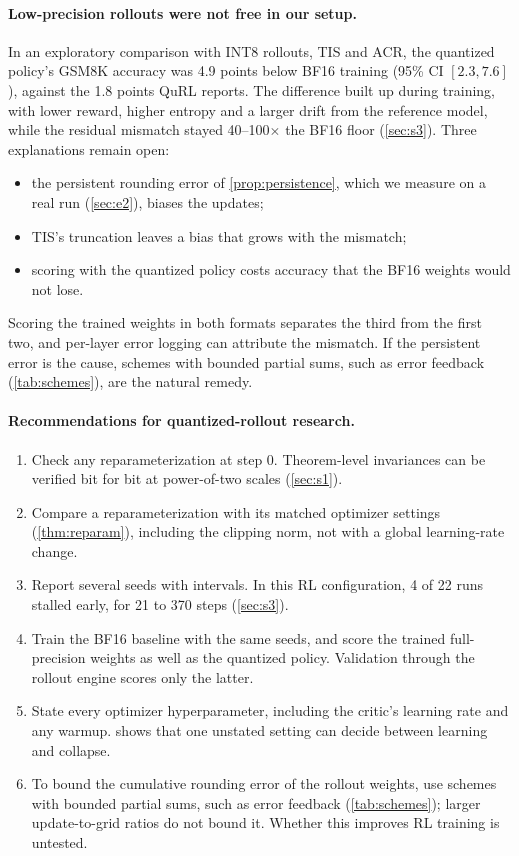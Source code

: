 \paragraph{Low-precision rollouts were not free in our setup.} In an exploratory comparison with INT8 rollouts, TIS and ACR, the quantized policy's GSM8K accuracy was 4.9 points below BF16 training (95\% CI $[2.3, 7.6]$), against the 1.8 points QuRL reports. The difference built up during training, with lower reward, higher entropy and a larger drift from the reference model, while the residual mismatch stayed 40--100$\times$ the BF16 floor (\cref{sec:s3}). Three explanations remain open:
\begin{itemize}[leftmargin=*,itemsep=1pt]
\item the persistent rounding error of \cref{prop:persistence}, which we measure on a real run (\cref{sec:e2}), biases the updates;
\item TIS's truncation leaves a bias that grows with the mismatch;
\item scoring with the quantized policy costs accuracy that the BF16 weights would not lose.
\end{itemize}
Scoring the trained weights in both formats separates the third from the first two, and per-layer error logging can attribute the mismatch. If the persistent error is the cause, schemes with bounded partial sums, such as error feedback (\cref{tab:schemes}), are the natural remedy.

\paragraph{Recommendations for quantized-rollout research.}
\begin{enumerate}[leftmargin=*,itemsep=1pt]
\item Check any reparameterization at step 0. Theorem-level invariances can be verified bit for bit at power-of-two scales (\cref{sec:s1}).
\item Compare a reparameterization with its matched optimizer settings (\cref{thm:reparam}), including the clipping norm, not with a global learning-rate change.
\item Report several seeds with intervals. In this RL configuration, 4 of 22 runs stalled early, for 21 to 370 steps (\cref{sec:s3}).
\item Train the BF16 baseline with the same seeds, and score the trained full-precision weights as well as the quantized policy. Validation through the rollout engine scores only the latter.
\item State every optimizer hyperparameter, including the critic's learning rate and any warmup.  shows that one unstated setting can decide between learning and collapse.
\item To bound the cumulative rounding error of the rollout weights, use schemes with bounded partial sums, such as error feedback (\cref{tab:schemes}); larger update-to-grid ratios do not bound it. Whether this improves RL training is untested.
\end{enumerate}

